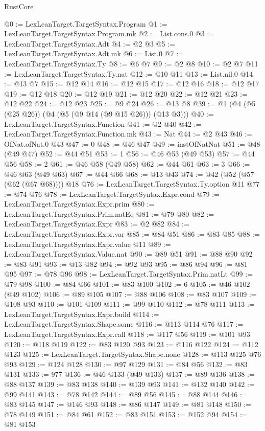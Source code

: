 \begin{lexlean}{RustCore}
\begin{coremodule}
@0 := LexLeanTarget.TargetSyntax.Program
@1 := LexLeanTarget.TargetSyntax.Program.mk
@2 := List.cons.{0}
@3 := LexLeanTarget.TargetSyntax.Adt
@4 := @2 @3
@5 := LexLeanTarget.TargetSyntax.Adt.mk
@6 := List.{0}
@7 := LexLeanTarget.TargetSyntax.Ty
@8 := @6 @7
@9 := @2 @8
@10 := @2 @7
@11 := LexLeanTarget.TargetSyntax.Ty.nat
@12 := @10 @11
@13 := List.nil.{0}
@14 := @13 @7
@15 := @12 @14
@16 := @12 @15
@17 := @12 @16
@18 := @12 @17
@19 := @12 @18
@20 := @12 @19
@21 := @12 @20
@22 := @12 @21
@23 := @12 @22
@24 := @12 @23
@25 := @9 @24
@26 := @13 @8
@39 := @1 (@4 (@5 (@25 @26)) (@4 (@5 (@9 @14 (@9 @15 @26))) (@13 @3)))
@40 := LexLeanTarget.TargetSyntax.Function
@41 := @2 @40
@42 := LexLeanTarget.TargetSyntax.Function.mk
@43 := Nat
@44 := @2 @43
@46 := OfNat.ofNat.{0} @43
@47 := 0
@48 := @46 @47
@49 := instOfNatNat
@51 := @48 (@49 @47)
@52 := @44 @51
@53 := 1
@56 := @46 @53 (@49 @53)
@57 := @44 @56
@58 := 2
@61 := @46 @58 (@49 @58)
@62 := @44 @61
@63 := 3
@66 := @46 @63 (@49 @63)
@67 := @44 @66
@68 := @13 @43
@74 := @42 (@52 (@57 (@62 (@67 @68)))) @18
@76 := LexLeanTarget.TargetSyntax.Ty.option @11
@77 := @74 @76
@78 := LexLeanTarget.TargetSyntax.Expr.cond
@79 := LexLeanTarget.TargetSyntax.Expr.prim
@80 := LexLeanTarget.TargetSyntax.Prim.natEq
@81 := @79 @80
@82 := LexLeanTarget.TargetSyntax.Expr
@83 := @2 @82
@84 := LexLeanTarget.TargetSyntax.Expr.var
@85 := @84 @51
@86 := @83 @85
@88 := LexLeanTarget.TargetSyntax.Expr.value @11
@89 := LexLeanTarget.TargetSyntax.Value.nat
@90 := @89 @51
@91 := @88 @90
@92 := @83 @91
@93 := @13 @82
@94 := @92 @93
@95 := @86 @94
@96 := @81 @95
@97 := @78 @96
@98 := LexLeanTarget.TargetSyntax.Prim.natLt
@99 := @79 @98
@100 := @84 @66
@101 := @83 @100
@102 := 6
@105 := @46 @102 (@49 @102)
@106 := @89 @105
@107 := @88 @106
@108 := @83 @107
@109 := @108 @93
@110 := @101 @109
@111 := @99 @110
@112 := @78 @111
@113 := LexLeanTarget.TargetSyntax.Expr.build
@114 := LexLeanTarget.TargetSyntax.Shape.some
@116 := @113 @114 @76
@117 := LexLeanTarget.TargetSyntax.Expr.call
@118 := @117 @56
@119 := @101 @93
@120 := @118 @119
@122 := @83 @120 @93
@123 := @116 @122
@124 := @112 @123
@125 := LexLeanTarget.TargetSyntax.Shape.none
@128 := @113 @125 @76 @93
@129 := @124 @128
@130 := @97 @129
@131 := @84 @56
@132 := @83 @131
@133 := 977
@136 := @46 @133 (@49 @133)
@137 := @89 @136
@138 := @88 @137
@139 := @83 @138
@140 := @139 @93
@141 := @132 @140
@142 := @99 @141
@143 := @78 @142
@144 := @89 @56
@145 := @88 @144
@146 := @83 @145
@147 := @146 @93
@148 := @86 @147
@149 := @81 @148
@150 := @78 @149
@151 := @84 @61
@152 := @83 @151
@153 := @152 @94
@154 := @81 @153

\end{coremodule}
\end{lexlean}
